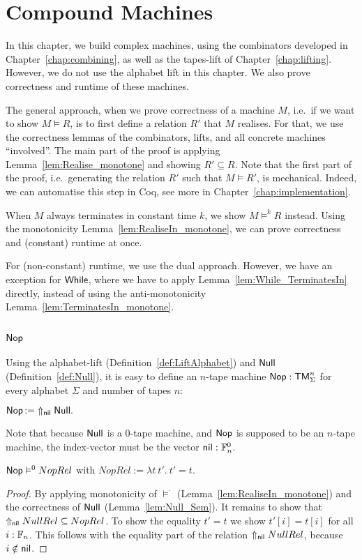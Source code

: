 \chapter{Compound Machines}
\label{cha:compound}

In this chapter, we build complex machines, using the combinators developed in Chapter~\ref{chap:combining}, as well as the tapes-lift of
Chapter~\ref{chap:lifting}.  However, we do not use the alphabet lift in this chapter.  We also prove correctness and runtime of these machines.

The general approach, when we prove correctness of a machine $M$, i.e.\ if we want to show $M \vDash R$, is to first define a relation $R'$ that $M$
realises.  For that, we use the correctness lemmas of the combinators, lifts, and all concrete machines ``involved''.  The main part of the proof is
applying Lemma~\ref{lem:Realise_monotone} and showing $R' \subseteq R$.  Note that the first part of the proof, i.e.\ generating the relation $R'$
such that $M \vDash R'$, is mechanical.  Indeed, we can automatise this step in Coq, see more in Chapter~\ref{chap:implementation}.

When $M$ always terminates in constant time $k$, we show $M \vDash^k R$ instead.  Using the monotonicity Lemma~\ref{lem:RealiseIn_monotone}, we can
prove correctness and (constant) runtime at once.

For (non-constant) runtime, we use the dual approach.  However, we have an exception for $\mathsf{While}$, where we have to apply
Lemma~\ref{lem:While_TerminatesIn} directly, instead of using the anti-monotonicity Lemma~\ref{lem:TerminatesIn_monotone}.

\section{$\Nop$}
\label{sec:Nop}

Using the alphabet-lift (Definition~\ref{def:LiftAlphabet}) and $\mathsf{Null}$ (Definition~\ref{def:Null}), it is easy to define an $n$-tape machine
$\mathsf{Nop} : \mathsf{TM}_\Sigma^n$ for every alphabet $\Sigma$ and number of tapes $n$:
\begin{definition}[$\Nop$]
  $\mathsf{Nop} \mathop{:=} \Uparrow_{\mathsf{nil}} \mathsf{Null}.$
\end{definition}
Note that because $\mathsf{Null}$ is a 0-tape machine, and $\Nop$ is supposed to be an $n$-tape machine, the index-vector must be the vector
$\mathsf{nil} : \mathbb{F}_n^0$.

\begin{lemma}
  \label{lem:Nop_Sem}
  $\mathsf{Nop} \vDash^0 NopRel$ with $NopRel := \lambda t~t'.~t'=t$.
\end{lemma}
\begin{proof}
  By applying monotonicity of $\vDash^\cdot$ (Lemma~\ref{lem:RealiseIn_monotone}) and the correctness of $\mathsf{Null}$ (Lemma~\ref{lem:Null_Sem}).  It
  remains to show that $\Uparrow_{\mathsf{nil}} NullRel \subseteq NopRel$.  To show the equality $t'=t$ we show $t'[i]=t[i]$ for all $i:\mathbb{F}_n$.  This
  follows with the equality part of the relation $\Uparrow_{\mathsf{nil}} NullRel$, because $i \notin \mathsf{nil}$.
\end{proof}

